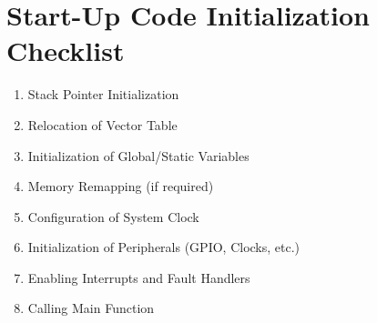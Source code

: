 \documentclass{article}
\begin{document}
\section*{Start-Up Code Initialization Checklist}
\begin{enumerate}[label=\textbf{\arabic*.}]
    \item Stack Pointer Initialization
    \item Relocation of Vector Table
    \item Initialization of Global/Static Variables
    \item Memory Remapping (if required)
    \item Configuration of System Clock
    \item Initialization of Peripherals (GPIO, Clocks, etc.)
    \item Enabling Interrupts and Fault Handlers
    \item Calling Main Function
\end{enumerate}
\end{document}
